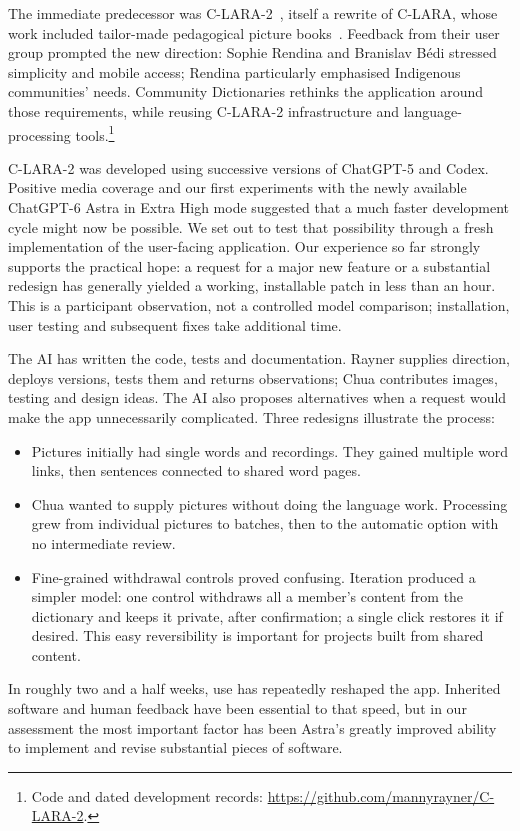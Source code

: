 \documentclass[11pt,a4paper]{article}
\newcommand{\topic}[1]{\vspace{6pt}{\large\bfseries\color{accent}#1\par}\vspace{2pt}}
\begin{document}
\newpage
\topic{3. An application designed to change}
The immediate predecessor was C-LARA-2~\cite{clara2}, itself a rewrite of
C-LARA, whose work included tailor-made pedagogical picture books~\cite{clara}.
Feedback from their user group prompted the new direction: Sophie Rendina and
Branislav B\'edi stressed simplicity and mobile access; Rendina particularly
emphasised Indigenous communities' needs. Community Dictionaries rethinks the
application around those requirements, while reusing C-LARA-2 infrastructure
and language-processing tools.\footnote{Code and dated development records:
\url{https://github.com/mannyrayner/C-LARA-2}.}

C-LARA-2 was developed using successive versions of ChatGPT-5 and Codex.
Positive media coverage and our first experiments with the newly available
ChatGPT-6 Astra in Extra High mode suggested that a much faster development
cycle might now be possible. We set out to test that possibility through a
fresh implementation of the user-facing application. Our experience so far
strongly supports the practical hope: a request for a major new feature or a
substantial redesign has generally yielded a working, installable patch in
less than an hour. This is a participant observation, not a controlled model
comparison; installation, user testing and subsequent fixes take additional time.

The AI has written the code, tests and documentation. Rayner supplies direction,
deploys versions, tests them and returns observations; Chua contributes images,
testing and design ideas. The AI also proposes alternatives when a request would
make the app unnecessarily complicated. Three redesigns illustrate the process:
\begin{itemize}
\item Pictures initially had single words and recordings. They gained multiple
word links, then sentences connected to shared word pages.
\item Chua wanted to supply pictures without doing the language work. Processing
grew from individual pictures to batches, then to the automatic option with no
intermediate review.
\item Fine-grained withdrawal controls proved confusing. Iteration produced a
simpler model: one control withdraws all a member's content from the dictionary
and keeps it private, after confirmation; a single click restores it if desired.
This easy reversibility is important for projects built from shared content.
\end{itemize}
In roughly two and a half weeks, use has repeatedly reshaped the app.
Inherited software and human feedback have been essential to that speed, but in
our assessment the most important factor has been Astra's greatly improved
ability to implement and revise substantial pieces of software.
\end{document}
